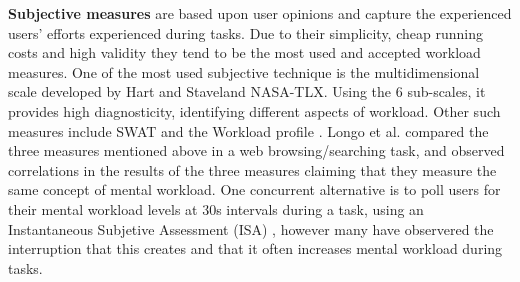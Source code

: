 \documentclass[../main/Feedback.tex]{subfiles}
\begin{document}
\textbf{Subjective measures} are based upon user opinions and capture the experienced users' efforts experienced during tasks.
Due to their simplicity, cheap running costs and high validity they tend to be the most used and accepted workload measures.
One of the most used subjective technique is the multidimensional scale developed by Hart and Staveland \cite{nasatlx} NASA-TLX.
Using the 6 sub-scales, it provides high diagnosticity, identifying different aspects of workload. Other such measures include SWAT \cite{reid1988subjective} and the Workload profile \cite{tsang1996diagnosticity}. Longo et al. \cite{longo2012importance} compared the three measures mentioned above in a web browsing/searching task, and observed correlations in the results of the three measures claiming that they measure the same concept of mental workload. One concurrent alternative is to poll users for their mental workload levels at 30s intervals during a task, using an Instantaneous Subjetive Assessment (ISA) \cite{brennan1992experimental}, however many have observered the interruption that this creates and that it often increases mental workload during tasks.

%
\end{document}
